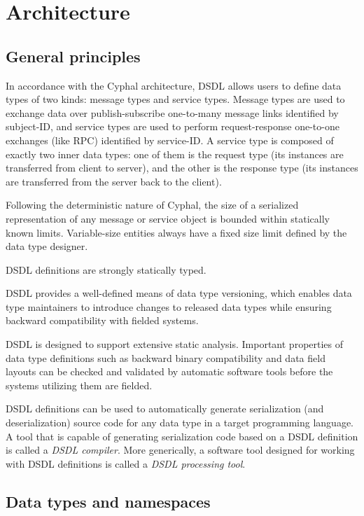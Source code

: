 \section{Architecture}

\subsection{General principles}

In accordance with the Cyphal architecture, DSDL allows users to define data types of two kinds:
message types and service types.
Message types are used to exchange data over publish-subscribe one-to-many message links identified by subject-ID,
and service types are used to perform request-response one-to-one exchanges (like RPC) identified by service-ID.
A service type is composed of exactly two inner data types:
one of them is the request type (its instances are transferred from client to server),
and the other is the response type (its instances are transferred from the server back to the client).

Following the deterministic nature of Cyphal, the size of a serialized representation of any
message or service object is bounded within statically known limits.
Variable-size entities always have a fixed size limit defined by the data type designer.

DSDL definitions are strongly statically typed.

DSDL provides a well-defined means of data type versioning, which enables data type maintainers to introduce changes
to released data types while ensuring backward compatibility with fielded systems.

DSDL is designed to support extensive static analysis. Important properties of data type definitions such as
backward binary compatibility and data field layouts can be checked and validated by automatic software tools
before the systems utilizing them are fielded.

DSDL definitions can be used to automatically generate serialization (and deserialization) source code
for any data type in a target programming language.
A tool that is capable of generating serialization code based on a DSDL definition is called a \emph{DSDL compiler}.
More generically, a software tool designed for working with DSDL definitions is called a
\emph{DSDL processing tool}.

\subsection{Data types and namespaces}

